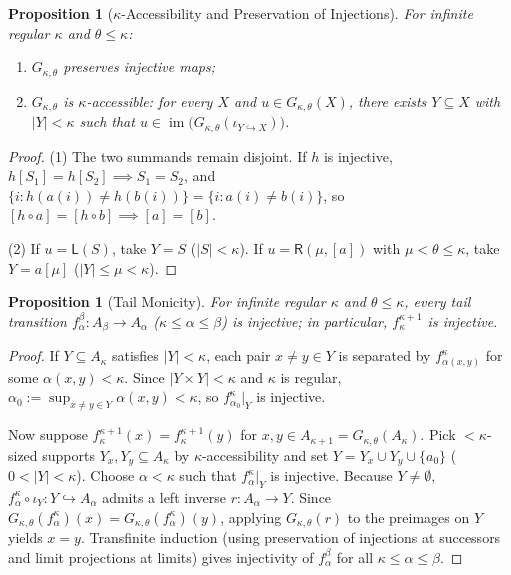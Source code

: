 \documentclass[11pt,a4paper]{article}
\theoremstyle{definition}
\theoremstyle{plain}
\newtheorem{proposition}[definition]{Proposition}
\newcommand{\im}{\operatorname{im}}
\begin{document}
\begin{proposition}[$\kappa$-Accessibility and Preservation of Injections]
For infinite regular $\kappa$ and $\theta \le \kappa$:
\begin{enumerate}[label=(\arabic*)]
  \item $G_{\kappa,\theta}$ preserves injective maps;
  \item $G_{\kappa,\theta}$ is $\kappa$-accessible: for every $X$ and $u \in G_{\kappa,\theta}(X)$, there exists $Y \subseteq X$ with $|Y| < \kappa$ such that $u \in \im\bigl(G_{\kappa,\theta}(\iota_{Y \hookrightarrow X})\bigr)$.
\end{enumerate}
\end{proposition}

\begin{proof}
(1) The two summands remain disjoint. If $h$ is injective, $h[S_1] = h[S_2] \implies S_1 = S_2$, and $\{i : h(a(i)) \neq h(b(i))\} = \{i : a(i) \neq b(i)\}$, so $[h \circ a] = [h \circ b] \implies [a] = [b]$.

(2) If $u = \mathsf{L}(S)$, take $Y = S$ ($|S| < \kappa$). If $u = \mathsf{R}(\mu, [a])$ with $\mu < \theta \le \kappa$, take $Y = a[\mu]$ ($|Y| \le \mu < \kappa$).
\end{proof}

\begin{proposition}[Tail Monicity]
For infinite regular $\kappa$ and $\theta \le \kappa$, every tail transition $f_\alpha^\beta : A_\beta \to A_\alpha$ ($\kappa \le \alpha \le \beta$) is injective; in particular, $f_\kappa^{\kappa+1}$ is injective.
\end{proposition}

\begin{proof}
If $Y \subseteq A_\kappa$ satisfies $|Y| < \kappa$, each pair $x \neq y \in Y$ is separated by $f_{\alpha(x,y)}^\kappa$ for some $\alpha(x,y) < \kappa$. Since $|Y \times Y| < \kappa$ and $\kappa$ is regular, $\alpha_0 := \sup_{x \neq y \in Y} \alpha(x,y) < \kappa$, so $f_{\alpha_0}^\kappa|_Y$ is injective.

Now suppose $f_\kappa^{\kappa+1}(x) = f_\kappa^{\kappa+1}(y)$ for $x, y \in A_{\kappa+1} = G_{\kappa,\theta}(A_\kappa)$. Pick $<\kappa$-sized supports $Y_x, Y_y \subseteq A_\kappa$ by $\kappa$-accessibility and set $Y = Y_x \cup Y_y \cup \{a_0\}$ ($0 < |Y| < \kappa$). Choose $\alpha < \kappa$ such that $f_\alpha^\kappa|_Y$ is injective. Because $Y \neq \emptyset$, $f_\alpha^\kappa \circ \iota_Y : Y \hookrightarrow A_\alpha$ admits a left inverse $r : A_\alpha \to Y$. Since $G_{\kappa,\theta}(f_\alpha^\kappa)(x) = G_{\kappa,\theta}(f_\alpha^\kappa)(y)$, applying $G_{\kappa,\theta}(r)$ to the preimages on $Y$ yields $x = y$. Transfinite induction (using preservation of injections at successors and limit projections at limits) gives injectivity of $f_\alpha^\beta$ for all $\kappa \le \alpha \le \beta$.
\end{proof}
\end{document}
